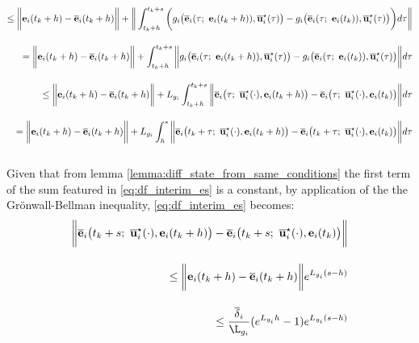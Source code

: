 \begin{gg_box}
\begin{align}
    \leq \bigg\| \vect{e}_i(t_k +h) - \overline{\vect{e}}_i(t_k + h) \bigg \|
    + \bigg\| \int_{t_k +h}^{t_k + s} \bigg( g_i\big(\overline{\vect{e}}_i(\tau;\ \vect{e}_i(t_k + h)), \overline{\vect{u}}_i^{\star}(\tau)\big)
    -  g_i\big(\overline{\vect{e}}_i(\tau;\ \vect{e}_i(t_k)), \overline{\vect{u}}_i^{\star}(\tau)\big) \bigg) d\tau \bigg\| \\[2.5ex]
    = \bigg\| \vect{e}_i(t_k +h) - \overline{\vect{e}}_i(t_k + h) \bigg \|
    + \int_{t_k +h}^{t_k + s} \bigg\| g_i\big(\overline{\vect{e}}_i(\tau;\ \vect{e}_i(t_k + h)), \overline{\vect{u}}_i^{\star}(\tau)\big)
    -  g_i\big(\overline{\vect{e}}_i(\tau;\ \vect{e}_i(t_k)), \overline{\vect{u}}_i^{\star}(\tau)\big) \bigg\| d\tau \\[2.5ex]
    \leq \bigg\| \vect{e}_i(t_k +h) - \overline{\vect{e}}_i(t_k + h) \bigg \|
    + L_{g_i} \int_{t_k +h}^{t_k + s} \bigg\| \overline{\vect{e}}_i\big(\tau;\ \overline{\vect{u}}_i^{\star}(\cdot), \vect{e}_i(t_k + h) \big)
    -  \overline{\vect{e}}_i\big(\tau;\ \overline{\vect{u}}_i^{\star}(\cdot), \vect{e}_i(t_k)\big) \bigg\| d\tau \\[2.5ex]
    = \bigg\| \vect{e}_i(t_k +h) - \overline{\vect{e}}_i(t_k + h) \bigg \|
    + L_{g_i} \int_{h}^{s} \bigg\| \overline{\vect{e}}_i\big(t_k + \tau;\ \overline{\vect{u}}_i^{\star}(\cdot), \vect{e}_i(t_k + h) \big)
    -  \overline{\vect{e}}_i\big(t_k + \tau;\ \overline{\vect{u}}_i^{\star}(\cdot), \vect{e}_i(t_k)\big) \bigg\| d\tau \\[2.5ex]
    \label{eq:df_interim_es}
\end{align}

Given that from lemma \eqref{lemma:diff_state_from_same_conditions}
the first term of the sum featured in \eqref{eq:df_interim_es} is a constant,
by application of the the Gr\"{o}nwall-Bellman inequality,
\eqref{eq:df_interim_es} becomes:
\begin{align}
  \bigg \| \overline{\vect{e}}_i\big(t_k + s;\ \overline{\vect{u}}_i^{\star}(\cdot), \vect{e}_i(t_k +h)\big)
    -\overline{\vect{e}}_i\big(t_k + s;\ \overline{\vect{u}}_i^{\star}(\cdot), \vect{e}_i(t_k)\big) \bigg \| \\[2.5ex]
    \leq \bigg\| \vect{e}_i(t_k +h) - \overline{\vect{e}}_i(t_k + h) \bigg \| e^{L_{g_i}(s-h)} \\[2.5ex]
    \leq \dfrac{\overline{\delta}_i}{\L_{g_i}} (e^{L_{g_i}h} - 1) e^{L_{g_i}(s-h)}
\end{align}
\end{gg_box}

